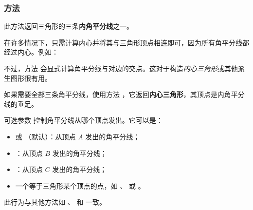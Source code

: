 \subsubsection{方法 } %
\label{ssub:method_triangle_bisector}

此方法返回三角形的三条\textbf{内角平分线}之一。

\medskip

在许多情况下，只需计算内心并将其与三角形顶点相连即可，因为所有角平分线都经过内心。例如：
\begin{mybox}
\end{mybox}


不过，方法  会显式计算角平分线与对边的交点。这对于构造\emph{内心三角形}或其他派生图形很有用。

\medskip

如果需要全部三条角平分线，使用方法 ，它返回\textbf{内心三角形}，其顶点是内角平分线的垂足。

\medskip

可选参数  控制角平分线从哪个顶点发出。它可以是：
\begin{itemize}
  \item {} 或 （默认）：从顶点 $A$ 发出的角平分线；
  \item {}：从顶点 $B$ 发出的角平分线；
  \item {}：从顶点 $C$ 发出的角平分线；
  \item 一个等于三角形某个顶点的点，如 、 或 。
\end{itemize}


此行为与其他方法如 、 和  一致。

